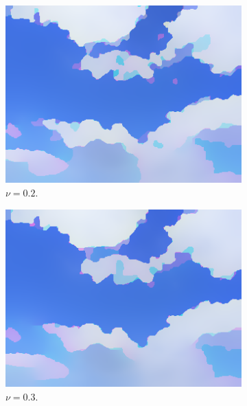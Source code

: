 \documentclass[abstracton]{scrreprt}
\begin{document}
            \begin{figure}[!ht]
                \centering
                \begin{subfigure}[b]{0.24\textwidth}
                    \includegraphics[width=\textwidth]{img/segmentation/rt/02blue.png}
                    \caption{$\nu = 0.2$.}
                \end{subfigure}
                \begin{subfigure}[b]{0.24\textwidth}
                    \includegraphics[width=\textwidth]{img/segmentation/rt/03blue.png}
                    \caption{$\nu = 0.3$.}
                \end{subfigure}
                \begin{subfigure}[b]{0.24\textwidth}

\end{subfigure}
\end{figure}
\end{document}
